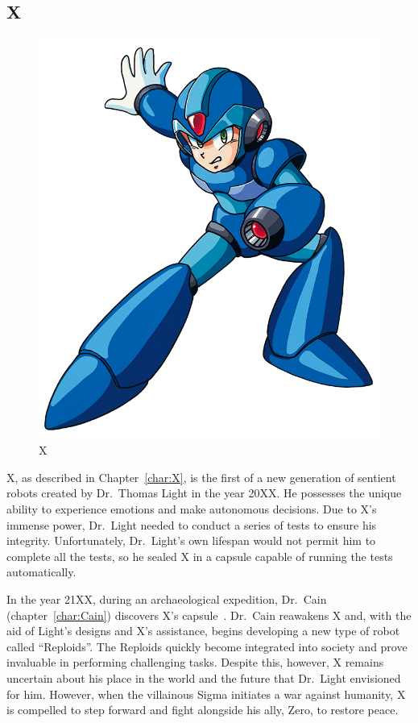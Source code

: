 \subsection{X}
\begin{figure}[htp]
	\centering
	\includegraphics[height=\portraitsize]{figures/X1/X_X1.png}
	\caption{X}
\end{figure}

X, as described in Chapter~\ref{char:X}, is the first of a new generation of sentient robots created by Dr.~Thomas Light in the year 20XX. He possesses the unique ability to experience emotions and make autonomous decisions. Due to X's immense power, Dr.~Light needed to conduct a series of tests to ensure his integrity. Unfortunately, Dr.~Light's own lifespan would not permit him to complete all the tests, so he sealed X in a capsule capable of running the tests automatically.

In the year 21XX, during an archaeological expedition, Dr.~Cain (chapter~\ref{char:Cain}) discovers X's capsule~\cite{X:Manual,wiki:Cain_journal}. Dr.~Cain reawakens X and, with the aid of Light's designs and X's assistance, begins developing a new type of robot called ``Reploids''. The Reploids quickly become integrated into society and prove invaluable in performing challenging tasks. Despite this, however, X remains uncertain about his place in the world and the future that Dr.~Light envisioned for him. However, when the villainous Sigma initiates a war against humanity, X is compelled to step forward and fight alongside his ally, Zero, to restore peace.

